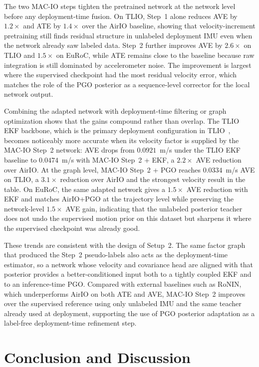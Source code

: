 

The two MAC-IO steps tighten the pretrained network at the network level before any deployment-time fusion.
On TLIO, Step~1 alone reduces AVE by $1.2\times$ and ATE by $1.4\times$ over the AirIO baseline, showing that velocity-increment pretraining still finds residual structure in unlabeled deployment IMU even when the network already saw labeled data.
Step~2 further improves AVE by $2.6\times$ on TLIO and $1.5\times$ on EuRoC, while ATE remains close to the baseline because raw integration is still dominated by accelerometer noise.
The improvement is largest where the supervised checkpoint had the most residual velocity error, which matches the role of the PGO posterior as a sequence-level corrector for the local network output.

Combining the adapted network with deployment-time filtering or graph optimization shows that the gains compound rather than overlap.
The TLIO EKF backbone, which is the primary deployment configuration in TLIO~\cite{liu2020tlio}, becomes noticeably more accurate when its velocity factor is supplied by the MAC-IO Step~2 network: AVE drops from $0.0921$~m/s under the TLIO EKF baseline to $0.0474$~m/s with MAC-IO Step~2 + EKF, a $2.2\times$ AVE reduction over AirIO.
At the graph level, MAC-IO Step~2 + PGO reaches $0.0334$~m/s AVE on TLIO, a $3.1\times$ reduction over AirIO and the strongest velocity result in the table.
On EuRoC, the same adapted network gives a $1.5\times$ AVE reduction with EKF and matches AirIO+PGO at the trajectory level while preserving the network-level $1.5\times$ AVE gain, indicating that the unlabeled posterior teacher does not undo the supervised motion prior on this dataset but sharpens it where the supervised checkpoint was already good.

These trends are consistent with the design of Setup~2.
The same factor graph that produced the Step~2 pseudo-labels also acts as the deployment-time estimator, so a network whose velocity and covariance head are aligned with that posterior provides a better-conditioned input both to a tightly coupled EKF and to an inference-time PGO.
Compared with external baselines such as RoNIN, which underperforms AirIO on both ATE and AVE, MAC-IO Step~2 improves over the supervised reference using only unlabeled IMU and the same teacher already used at deployment, supporting the use of PGO posterior adaptation as a label-free deployment-time refinement step.

\section{Conclusion and Discussion}
\label{sec:macio:conclusion}

